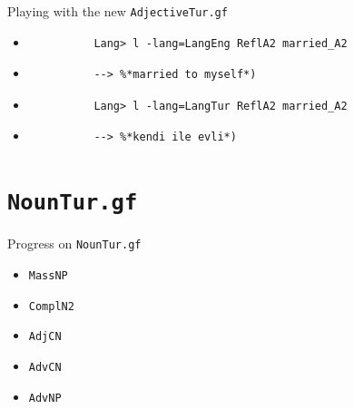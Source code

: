 \documentclass{beamer}
\begin{document}
  \begin{frame}[fragile]{Playing with the new \texttt{AdjectiveTur.gf}}
    \begin{itemize}
      \item<1->
        \begin{lstlisting}
          Lang> l -lang=LangEng ReflA2 married_A2
        \end{lstlisting}
      \item<2->
        \begin{lstlisting}
          --> %*married to myself*)
        \end{lstlisting}
      \item<3->
        \begin{lstlisting}
          Lang> l -lang=LangTur ReflA2 married_A2
        \end{lstlisting}
      \item<4->
        \begin{lstlisting}
          --> %*kendi ile evli*)
        \end{lstlisting}
    \end{itemize}
  \end{frame}

  \section{\texttt{NounTur.gf}}

  \begin{frame}{Progress on \texttt{NounTur.gf}}
    \begin{itemize}
      \item \texttt{MassNP}
      \item \texttt{ComplN2}
      \item \texttt{AdjCN}
      \item \texttt{AdvCN}
      \item \texttt{AdvNP}
    \end{itemize}
  \end{frame}
\end{document}
